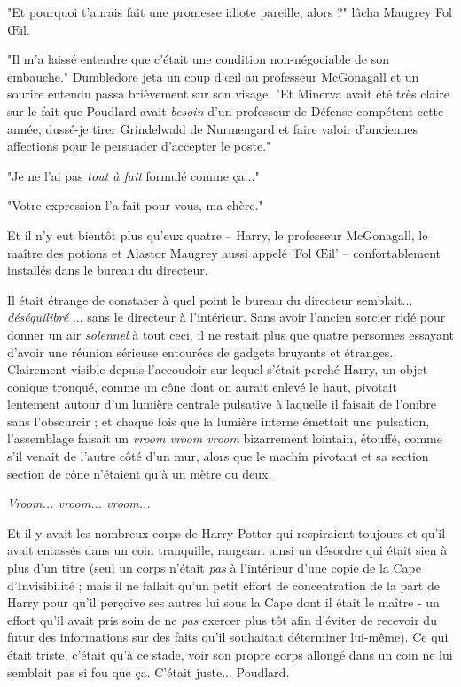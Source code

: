 "Et pourquoi t'aurais fait une promesse idiote pareille, alors ?" lâcha Maugrey Fol Œil.

"Il m'a laissé entendre que c'était une condition non-négociable de son embauche." Dumbledore jeta un coup d'œil au professeur McGonagall et un sourire entendu passa brièvement sur son visage. "Et Minerva avait été très claire sur le fait que Poudlard avait \emph{besoin}  d'un professeur de Défense compétent cette année, dussé-je tirer Grindelwald de Nurmengard et faire valoir d'anciennes affections pour le persuader d'accepter le poste."

"Je ne l'ai pas \emph{tout à fait}  formulé comme ça..."

"Votre expression l'a fait pour vous, ma chère."

Et il n'y eut bientôt plus qu'eux quatre – Harry, le professeur McGonagall, le maître des potions et Alastor Maugrey aussi appelé 'Fol Œil' – confortablement installés dans le bureau du directeur.

Il était étrange de constater à quel point le bureau du directeur semblait...\emph{ déséquilibré} ... sans le directeur à l'intérieur. Sans avoir l'ancien sorcier ridé pour donner un air \emph{solennel } à tout ceci, il ne restait plus que quatre personnes essayant d'avoir une réunion sérieuse entourées de gadgets bruyants et étranges. Clairement visible depuis l'accoudoir sur lequel s'était perché Harry, un objet conique tronqué, comme un cône dont on aurait enlevé le haut, pivotait lentement autour d'un lumière centrale pulsative à laquelle il faisait de l'ombre sans l'obscurcir ; et chaque fois que la lumière interne émettait une pulsation, l'assemblage faisait un \emph{vroom vroom vroom } bizarrement lointain, étouffé, comme s'il venait de l'autre côté d'un mur, alors que le machin pivotant et sa section section de cône n'étaient qu'à un mètre ou deux.

\emph{Vroom... vroom... vroom...} 

Et il y avait les nombreux corps de Harry Potter qui respiraient toujours et qu'il avait entassés dans un coin tranquille, rangeant ainsi un désordre qui était sien à plus d'un titre (seul un corps n'était \emph{pas } à l'intérieur d'une copie de la Cape d'Invisibilité ; mais il ne fallait qu'un petit effort de concentration de la part de Harry pour qu'il perçoive ses autres lui sous la Cape dont il était le maître - un effort qu'il avait pris soin de ne \emph{pas } exercer plus tôt afin d'éviter de recevoir du futur des informations sur des faits qu'il souhaitait déterminer lui-même). Ce qui était triste, c'était qu'à ce stade, voir son propre corps allongé dans un coin ne lui semblait pas si fou que ça. C'était juste... Poudlard.

